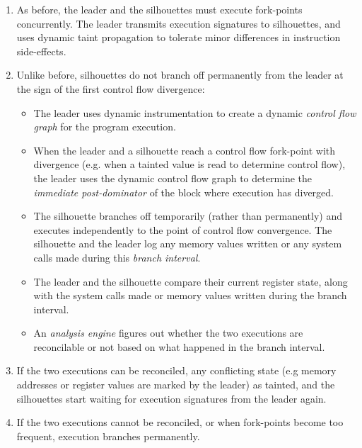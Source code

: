 \begin{enumerate}

\item As before, the leader and the
  silhouettes must execute fork-points concurrently. The leader 
  transmits execution signatures to silhouettes, and uses dynamic taint propagation 
  to tolerate minor differences in instruction side-effects.

\item Unlike before, silhouettes do not branch off permanently
  from the leader at the sign of the first control flow divergence:

\begin{itemize}
\item The leader uses dynamic instrumentation to
  create a dynamic {\em control flow graph}
  for the program execution.

\item  When the leader and a silhouette reach a
  control flow fork-point with divergence (e.g. when a tainted value
  is read to determine control flow), the
  leader uses the dynamic control flow
  graph to determine the {\em immediate post-dominator}
  of the block where execution has diverged.

\item   The silhouette branches off
  temporarily (rather than permanently)
  and executes independently to the 
  point of control flow convergence.
  The silhouette and the leader log
  any memory values written 
  or any system calls made
  during this {\em branch interval}.

\item 
  The leader and the silhouette
  compare their current register state, along with the system calls made
  or memory values written during the branch interval. 

\item  An {\em analysis engine} figures out
  whether the two executions are reconcilable
  or not based on what happened
  in the branch interval. 
\end{itemize}

\item 
  If the two executions can be reconciled,
  any conflicting state (e.g memory addresses 
  or register values are
  marked by the leader) as tainted,
  and the silhouettes start
  waiting for execution signatures
  from the leader again.

\item 
  If the two executions cannot be reconciled,
  or when fork-points become too frequent,
  execution branches permanently.
\end{enumerate}

